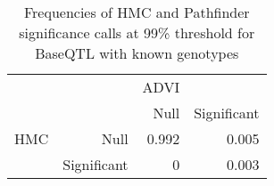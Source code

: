 \begin{table}[ht]
\centering
\caption{Frequencies of HMC and Pathfinder significance calls at 99\% threshold for BaseQTL with known genotypes} 
\label{tab:GT-xtab-prop-99-pfp}
\begin{tabular}{rr|rr}
   &  & ADVI &  \\ 
    &   & Null & Significant \\ 
   \hline
HMC & Null & 0.992 & 0.005 \\ 
    & Significant & 0 & 0.003 \\ 
  \end{tabular}
\end{table}
